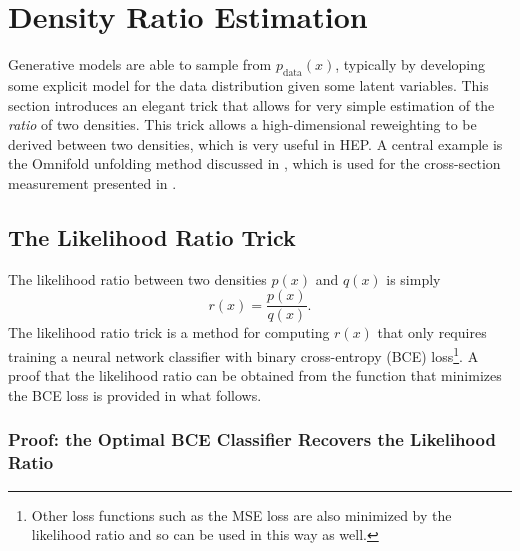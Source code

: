 
\section{Density Ratio Estimation}
\label{sec:dre}

Generative models are able to sample from $p_\text{data}(x)$, typically by developing some explicit model for the data distribution given some latent variables.
This section introduces an elegant trick that allows for very simple estimation of the \textit{ratio} of two densities.
This trick allows a high-dimensional reweighting to be derived between two densities, which is very useful in HEP.
A central example is the Omnifold unfolding method discussed in , which is used for the cross-section measurement presented in .

\subsection{The Likelihood Ratio Trick}
\label{sec:lrt}

The likelihood ratio between two densities $p(x)$ and $q(x)$ is simply
\begin{equation}
    r(x) = \frac{p(x)}{q(x)}.
    \label{eqn:likelihood_ratio}
\end{equation}
The likelihood ratio trick is a method for computing $r(x)$ that only requires training a neural network classifier with binary cross-entropy (BCE) loss\footnote{Other loss functions such as the MSE loss are also minimized by the likelihood ratio and so can be used in this way as well.}.
A proof that the likelihood ratio can be obtained from the function that minimizes the BCE loss is provided in what follows.

\subsubsection{Proof: the Optimal BCE Classifier Recovers the Likelihood Ratio}

